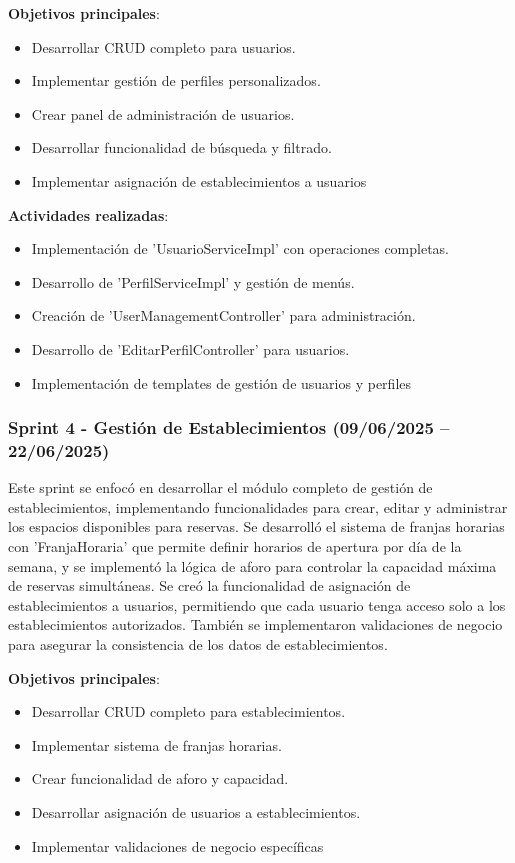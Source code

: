 \textbf{Objetivos principales}:
\begin{itemize}
\tightlist
\item
Desarrollar CRUD completo para usuarios.
\item
Implementar gestión de perfiles personalizados.
\item
Crear panel de administración de usuarios.
\item
Desarrollar funcionalidad de búsqueda y filtrado.
\item
Implementar asignación de establecimientos a usuarios
\end{itemize}

\textbf{Actividades realizadas}:
\begin{itemize}
\tightlist
\item
Implementación de 'UsuarioServiceImpl' con operaciones completas.
\item
Desarrollo de 'PerfilServiceImpl' y gestión de menús.
\item
Creación de 'UserManagementController' para administración.
\item
Desarrollo de 'EditarPerfilController' para usuarios.
\item
Implementación de templates de gestión de usuarios y perfiles
\end{itemize}

\subsubsection{Sprint 4 - Gestión de Establecimientos (09/06/2025 – 22/06/2025)} 
Este sprint se enfocó en desarrollar el módulo completo de gestión de establecimientos, implementando funcionalidades para crear, editar y administrar los espacios disponibles para reservas. Se desarrolló el sistema de franjas horarias con 'FranjaHoraria' que permite definir horarios de apertura por día de la semana, y se implementó la lógica de aforo para controlar la capacidad máxima de reservas simultáneas. Se creó la funcionalidad de asignación de establecimientos a usuarios, permitiendo que cada usuario tenga acceso solo a los establecimientos autorizados. También se implementaron validaciones de negocio para asegurar la consistencia de los datos de establecimientos.

\textbf{Objetivos principales}:
\begin{itemize}
\tightlist
\item
Desarrollar CRUD completo para establecimientos.
\item
Implementar sistema de franjas horarias.
\item
Crear funcionalidad de aforo y capacidad.
\item
Desarrollar asignación de usuarios a establecimientos.
\item
Implementar validaciones de negocio específicas
\end{itemize}

